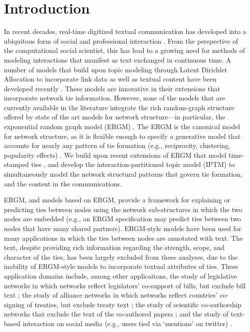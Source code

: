 \documentclass[twoside]{article}
\begin{document}
\section{Introduction}

In recent decades, real-time digitized textual communication has developed into a ubiquitous form of social and professional interaction \citep[see, e.g.,][]{kanungo2008modeling, szostek2011dealing, burgess2004email, pew2016}. From the perspective of the computational social scientist, this has lead to a growing need for methods of modeling interactions that manifest as text exchanged in continuous time. A number of models that build upon topic modeling through Latent Dirichlet Allocation \citep{Blei2003} to incorporate link data as well as textual content have been developed recently \citep{mccallum2005author,lim2013twitter,Krafft2012}. These models are innovative in their extensions that incorporate network tie information. However, none of the models that are currently available in the literature integrate the rich random-graph structure offered by state of the art models for network structure---in particular, the exponential random graph model (ERGM) \citep{robins2007introduction,chatterjee2013estimating,hunter2008ergm}. The ERGM is the canonical model for network structure, as it is flexible enough to specify a generative model that accounts for nearly any pattern of tie formation (e.g., reciprocity, clustering, popularity effects) \citep{desmarais2017statistical}. We build upon recent extensions of ERGM that model time-stamped ties \citep{PerryWolfe2012,Butts2008}, and develop the interaction-partitioned topic model (IPTM) to simultaneously model the network structural patterns that govern tie formation, and the content in the communications.

ERGM, and models based on ERGM, provide a framework for explaining or predicting ties between nodes using the network sub-structures in which the two nodes are embedded (e.g., an ERGM specification may predict ties between two nodes that have many shared partners). ERGM-style models have been used for many applications in which the ties between nodes are annotated with text. The text, despite providing rich information regarding the strength, scope, and character of the ties, has been largely excluded from these analyses, due to the inability of ERGM-style models to incorporate textual attributes of ties. These application domains include, among other applicaitons, the study of legislative networks in which networks reflect legislators' co-support of bills, but exclude bill text \citep{bratton2011networks,aleman2013explaining}; the study of alliance networks in which networks reflect countries' co-signing of treaties, but exclude treaty text \citep{camber2010geometry,cranmer2012complex,cranmer2012toward,kinne2016agreeing}; the study of scientific co-authorship networks that exclude the text of the co-authored papers \citep{kronegger2011collaboration,liang2015changing,fahmy2016gender}; and the study of text-based interaction on social media (e.g., users tied via `mentions' on twitter) \citep{yoon2014strategies,peng2016follower,lai2017connecting}.
\end{document}
